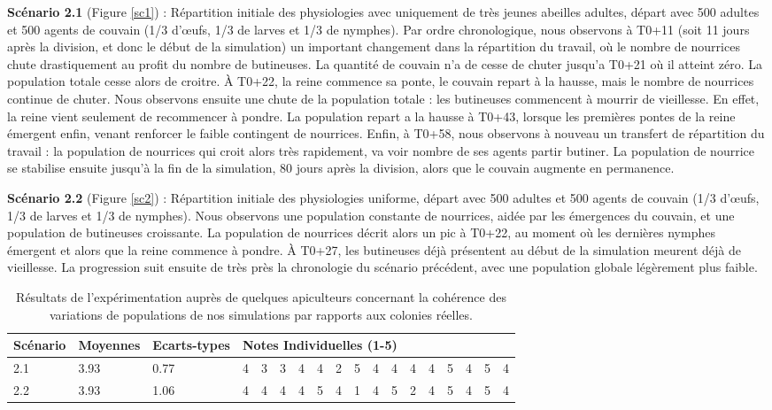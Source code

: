 		\textbf{Scénario 2.1} (Figure \ref{sc1}) : Répartition initiale des physiologies avec uniquement de très jeunes abeilles adultes, départ avec 500 adultes et 500 agents de couvain (1/3 d'œufs, 1/3 de larves et 1/3 de nymphes). Par ordre chronologique, nous observons à T0+11 (soit 11 jours après la division, et donc le début de la simulation) un important changement dans la répartition du travail, où le nombre de nourrices chute drastiquement au profit du nombre de butineuses. La quantité de couvain n'a de cesse de chuter jusqu'a T0+21 où il atteint zéro. La population totale cesse alors de croitre. À T0+22, la reine commence sa ponte, le couvain repart à la hausse, mais le nombre de nourrices continue de chuter. Nous observons ensuite une chute de la population totale : les butineuses commencent à mourrir de vieillesse. En effet, la reine vient seulement de recommencer à pondre. La population repart a la hausse à T0+43, lorsque les premières pontes de la reine émergent enfin, venant renforcer le faible contingent de nourrices. Enfin, à T0+58, nous observons à nouveau un transfert de répartition du travail : la population de nourrices qui croit alors très rapidement, va voir nombre de ses agents partir butiner. La population de nourrice se stabilise ensuite jusqu'à la fin de la simulation, 80 jours après la division, alors que le couvain augmente en permanence.
		
		\textbf{Scénario 2.2} (Figure \ref{sc2}) : Répartition initiale des physiologies uniforme, départ avec 500 adultes et 500 agents de couvain (1/3 d'œufs, 1/3 de larves et 1/3 de nymphes). Nous observons une population constante de nourrices, aidée par les émergences du couvain, et une population de butineuses croissante. La population de nourrices décrit alors un pic à T0+22, au moment où les dernières nymphes émergent et alors que la reine commence à pondre. À T0+27, les butineuses déjà présentent au début de la simulation meurent déjà de vieillesse. La progression suit ensuite de très près la chronologie du scénario précédent, avec une population globale légèrement plus faible.
	
	
	\begin{table}
	\centering
	\begin{tabular}{l|l|l|lllllllllllllll}
	Scénario & Moyennes & Ecarts-types & \multicolumn{15}{l}{Notes Individuelles (1-5)}\\
	\hline
	2.1 & 3.93 & 0.77 &4&3&3&4&4&2&5&4&4&4&4&5&4&5&4\\
	2.2 & 3.93 & 1.06 &4&4&4&4&5&4&1&4&5&2&4&5&4&5&4\\	
	\end{tabular}
	\caption{Résultats de l'expérimentation auprès de quelques apiculteurs concernant la cohérence des variations de populations de nos simulations par rapports aux colonies réelles.}
	\label{TabResCoherence}
	\end{table}
	
